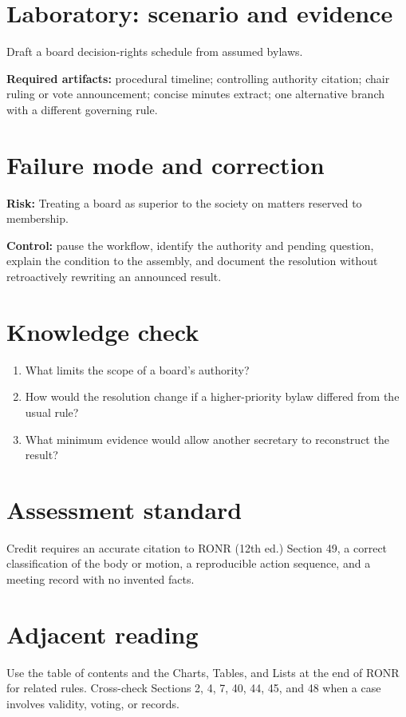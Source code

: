\documentclass[11pt]{article}
\begin{document}
\section{Laboratory: scenario and evidence}
Draft a board decision-rights schedule from assumed bylaws.

\textbf{Required artifacts:} procedural timeline; controlling authority citation; chair ruling or vote announcement; concise minutes extract; one alternative branch with a different governing rule.

\section{Failure mode and correction}
\textbf{Risk:} Treating a board as superior to the society on matters reserved to membership.

\textbf{Control:} pause the workflow, identify the authority and pending question, explain the condition to the assembly, and document the resolution without retroactively rewriting an announced result.

\section{Knowledge check}
\begin{enumerate}[leftmargin=*,itemsep=4pt]
\item What limits the scope of a board’s authority?
\item How would the resolution change if a higher-priority bylaw differed from the usual rule?
\item What minimum evidence would allow another secretary to reconstruct the result?
\end{enumerate}

\section{Assessment standard}
Credit requires an accurate citation to RONR (12th ed.) Section 49, a correct classification of the body or motion, a reproducible action sequence, and a meeting record with no invented facts.

\section{Adjacent reading}
Use the table of contents and the Charts, Tables, and Lists at the end of RONR for related rules. Cross-check Sections 2, 4, 7, 40, 44, 45, and 48 when a case involves validity, voting, or records.
\end{document}
